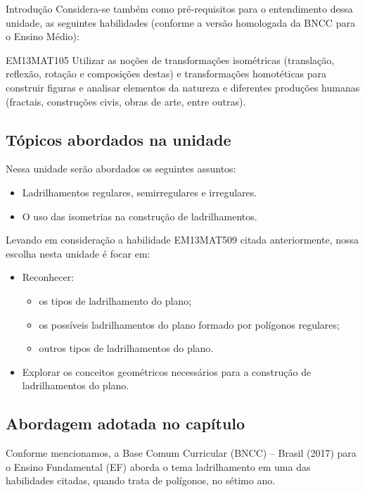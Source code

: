 \begin{apresentacao}{Introdução}
Considera-se também como pré-requisitos para o entendimento dessa unidade, as seguintes habilidades (conforme a versão homologada da BNCC para o Ensino Médio):
\begin{habilities}{EM13MAT105} 
Utilizar as noções de transformações isométricas (translação, reflexão,
rotação e composições destas) e transformações homotéticas para construir figuras e
analisar elementos da natureza e diferentes produções humanas (fractais, construções
civis, obras de arte, entre outras).
\end{habilities}

\subsection *{Tópicos abordados na unidade}
Nessa unidade serão abordados os seguintes assuntos:
\begin{itemize}
\item  Ladrilhamentos regulares, semirregulares e irregulares.
\item  O uso das isometrias na construção de ladrilhamentos.
\end{itemize}
	

Levando em consideração a habilidade EM13MAT509 citada anteriormente, nossa escolha nesta unidade é focar em:

\vspace{-1em}
\begin{itemize}
\item Reconhecer: 
\vspace{-.5em}
\begin{itemize}
\item os tipos de ladrilhamento do plano;
\item os possíveis ladrilhamentos do plano formado por polígonos regulares;
\item outros tipos de ladrilhamentos do plano.
\end{itemize}
\vspace{-.5em}
\item Explorar os conceitos geométricos necessários para a construção de ladrilhamentos do plano.
\end{itemize}
\vspace{-1em}


\subsection *{Abordagem adotada no capítulo}

Conforme mencionamos, a Base Comum Curricular (BNCC) – Brasil (2017) para o Ensino Fundamental (EF) aborda o tema ladrilhamento em uma das habilidades citadas, quando trata de polígonos, no sétimo ano.


\end{apresentacao}
